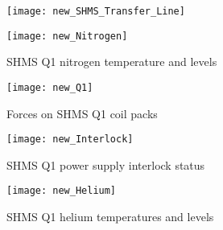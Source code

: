 \begin{figure}
\texttt{[image: new\_SHMS\_Transfer\_Line]}
\caption{\label{fig:magc_SHMS_Transfer_Line}}
\end{figure}


\begin{figure}
\texttt{[image: new\_Nitrogen]}
\caption{\label{fig:magc_Nitrogen}SHMS Q1 nitrogen temperature and levels}
\end{figure}


\begin{figure}
\texttt{[image: new\_Q1]}
\caption{\label{fig:magc_q1}Forces on SHMS Q1 coil packs}
\end{figure}


\begin{figure}
\texttt{[image: new\_Interlock]}
\caption{\label{fig:magc_Interlock}SHMS Q1 power supply interlock status}
\end{figure}


\begin{figure}
\texttt{[image: new\_Helium]}
\caption{\label{fig:magc_Helium}SHMS Q1 helium temperatures and levels}
\end{figure}





